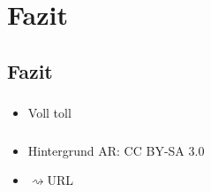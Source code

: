 \documentclass[xcolor=svgnames,ngerman]{beamer} %
\newcommand{\arr}[0]{$\rightsquigarrow${}{}}
\begin{document}
\section{Fazit}

\subsection{Fazit}
\begin{frame}[fragile]
\frametitle{}
  \begin{itemize}
    \item Voll toll
  \end{itemize}
\end{frame}

\begin{frame}[fragile]
\frametitle{}
  \begin{itemize}
    \item Hintergrund AR: CC BY-SA 3.0
    \item \arr URL
  \end{itemize}
\end{frame}

\end{document}
